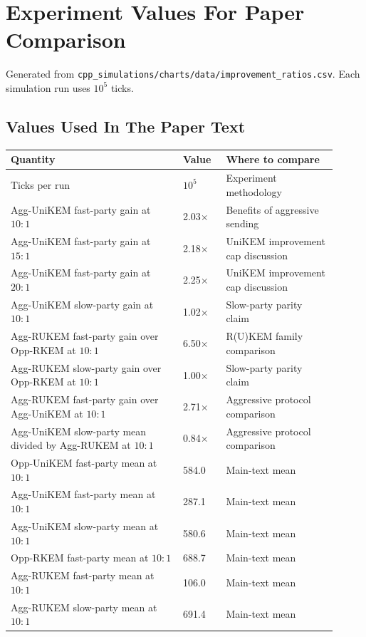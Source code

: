 \documentclass{article}
\begin{document}
\section*{Experiment Values For Paper Comparison}
Generated from \texttt{cpp\_simulations/charts/data/improvement\_ratios.csv}. Each simulation run uses $10^5$ ticks.

\subsection*{Values Used In The Paper Text}
\small
\begin{tabular}{@{}p{0.48\linewidth}p{0.12\linewidth}p{0.31\linewidth}@{}}
\toprule
Quantity & Value & Where to compare \\
\midrule
Ticks per run & $10^5$ & Experiment methodology \\
Agg-UniKEM fast-party gain at $10{:}1$ & 2.03$\times$ & Benefits of aggressive sending \\
Agg-UniKEM fast-party gain at $15{:}1$ & 2.18$\times$ & UniKEM improvement cap discussion \\
Agg-UniKEM fast-party gain at $20{:}1$ & 2.25$\times$ & UniKEM improvement cap discussion \\
Agg-UniKEM slow-party gain at $10{:}1$ & 1.02$\times$ & Slow-party parity claim \\
Agg-RUKEM fast-party gain over Opp-RKEM at $10{:}1$ & 6.50$\times$ & R(U)KEM family comparison \\
Agg-RUKEM slow-party gain over Opp-RKEM at $10{:}1$ & 1.00$\times$ & Slow-party parity claim \\
Agg-RUKEM fast-party gain over Agg-UniKEM at $10{:}1$ & 2.71$\times$ & Aggressive protocol comparison \\
Agg-UniKEM slow-party mean divided by Agg-RUKEM at $10{:}1$ & 0.84$\times$ & Aggressive protocol comparison \\
Opp-UniKEM fast-party mean at $10{:}1$ & 584.0 & Main-text mean \\
Agg-UniKEM fast-party mean at $10{:}1$ & 287.1 & Main-text mean \\
Agg-UniKEM slow-party mean at $10{:}1$ & 580.6 & Main-text mean \\
Opp-RKEM fast-party mean at $10{:}1$ & 688.7 & Main-text mean \\
Agg-RUKEM fast-party mean at $10{:}1$ & 106.0 & Main-text mean \\
Agg-RUKEM slow-party mean at $10{:}1$ & 691.4 & Main-text mean \\
\bottomrule
\end{tabular}
\end{document}
